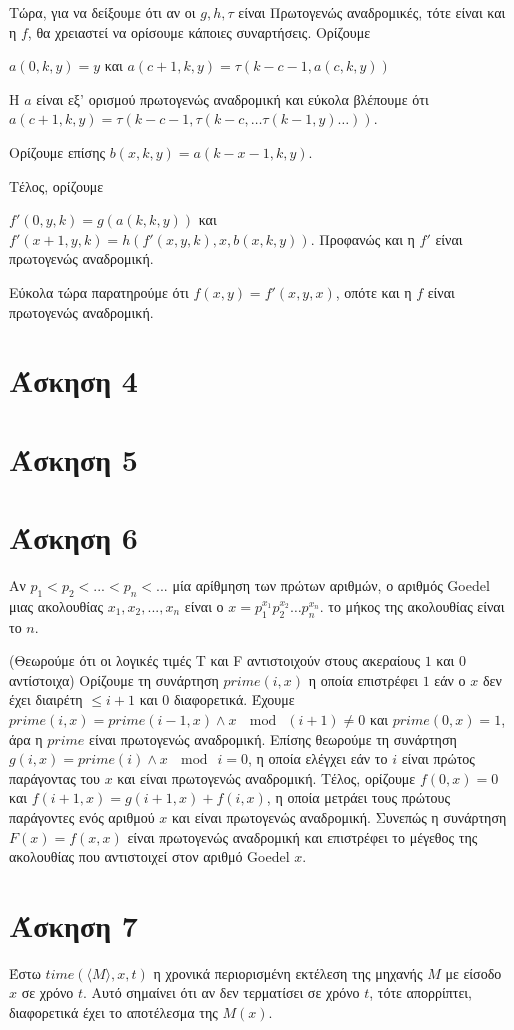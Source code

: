 \documentclass[a4paper, oneside, 11pt]{article}
\theoremstyle{definition}
\begin{document}
Τώρα, για να δείξουμε ότι αν οι $g, h,\tau$ είναι Πρωτογενώς αναδρομικές, τότε είναι και η $f$, θα χρειαστεί να ορίσουμε κάποιες
συναρτήσεις.
Ορίζουμε

$a(0,k,y)=y$ και $a(c+1,k,y)=\tau(k-c-1,a(c,k,y))$

Η $a$ είναι εξ' ορισμού πρωτογενώς αναδρομική και εύκολα βλέπουμε ότι $a(c+1,k,y)=\tau(k-c-1,\tau(k-c,\dots\tau(k-1,y)\dots))$.

Ορίζουμε επίσης $b(x,k,y)=a(k-x-1,k,y)$. 

Τέλος, ορίζουμε

$f'(0,y,k)=g(a(k,k,y))$ και $f'(x+1,y,k)=h(f'(x,y,k),x,b(x,k,y))$. Προφανώς και η $f'$ είναι πρωτογενώς αναδρομική.

Εύκολα τώρα παρατηρούμε ότι $f(x,y)=f'(x,y,x)$, οπότε και η $f$ είναι πρωτογενώς αναδρομική.

\section*{Άσκηση 4}
\section*{Άσκηση 5}
\section*{Άσκηση 6}
Αν $p_1<p_2<...<p_n<...$ μία αρίθμηση των πρώτων αριθμών, ο αριθμός Goedel μιας ακολουθίας $x_1,x_2,...,x_n$ είναι ο
$x = p_1^{x_1}p_2^{x_2}\dots p_n^{x_n}$. το μήκος της ακολουθίας είναι το $n$.

(Θεωρούμε ότι οι λογικές τιμές T και F αντιστοιχούν στους ακεραίους $1$ και $0$ αντίστοιχα)
Ορίζουμε τη συνάρτηση $prime(i,x)$ η οποία επιστρέφει $1$ εάν ο $x$ δεν έχει διαιρέτη $\leq i+1$ και $0$ διαφορετικά.
Έχουμε $prime(i,x)=prime(i-1,x)\land x\ \mod\ (i+1)\neq 0$ και $prime(0,x)=1$, άρα η $prime$ είναι πρωτογενώς αναδρομική.
Επίσης θεωρούμε τη συνάρτηση $g(i,x)=prime(i)\land x\ \mod\ i=0$, η οποία ελέγχει εάν το $i$ είναι πρώτος παράγοντας του $x$ και
είναι πρωτογενώς αναδρομική. Τέλος, ορίζουμε $f(0,x)=0$ και $f(i+1,x)=g(i+1,x) + f(i,x)$, η οποία μετράει τους πρώτους παράγοντες
ενός αριθμού $x$ και είναι πρωτογενώς αναδρομική. Συνεπώς η συνάρτηση $F(x)=f(x,x)$ είναι πρωτογενώς αναδρομική και επιστρέφει
το μέγεθος της ακολουθίας που αντιστοιχεί στον αριθμό Goedel $x$.


\section*{Άσκηση 7}
Έστω $time(\langle M\rangle, x, t)$ η χρονικά περιορισμένη εκτέλεση της μηχανής $M$ με είσοδο $x$ σε χρόνο $t$. Αυτό σημαίνει ότι αν δεν τερματίσει σε χρόνο $t$, τότε απορρίπτει,
διαφορετικά έχει το αποτέλεσμα της $M(x)$.
\end{document}
